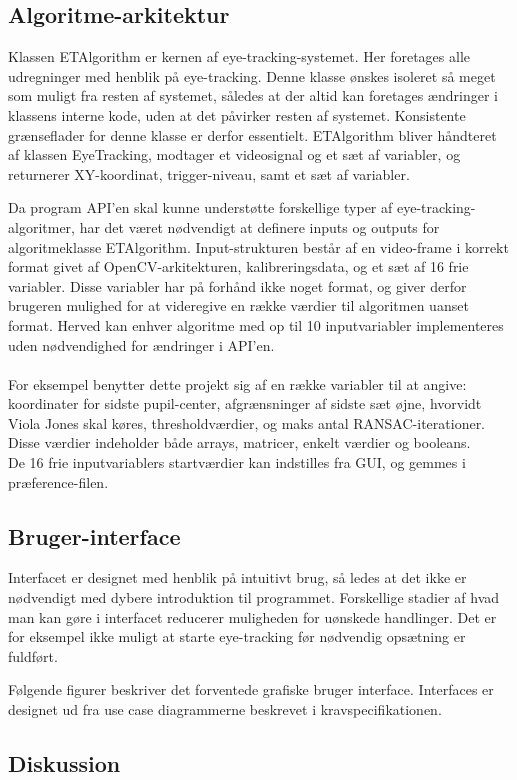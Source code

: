 \documentclass[rapport.tex]{subfiles}
\begin{document}
	\subsection{Algoritme-arkitektur}
	Klassen ETAlgorithm er kernen af eye-tracking-systemet. Her foretages alle udregninger med henblik på eye-tracking. Denne klasse ønskes isoleret så meget som muligt fra resten af systemet, således at der altid kan foretages ændringer i klassens interne kode, uden at det påvirker resten af systemet. Konsistente grænseflader for denne klasse er derfor essentielt. 
	ETAlgorithm bliver håndteret af klassen EyeTracking, modtager et videosignal og et sæt af variabler, og returnerer XY-koordinat, trigger-niveau, samt et sæt af variabler. 
	
	Da program API'en skal kunne understøtte forskellige typer af eye-tracking-algoritmer, har det været nødvendigt at definere inputs og outputs for algoritmeklasse ETAlgorithm. Input-strukturen består af en video-frame i korrekt format givet af OpenCV-arkitekturen, kalibreringsdata, og et sæt af 16 frie variabler. Disse variabler har på forhånd ikke noget format, og giver derfor brugeren mulighed for at videregive en række værdier til algoritmen uanset format. Herved kan enhver algoritme med op til 10 inputvariabler implementeres uden nødvendighed for ændringer i API'en.\\
	\\
	 For eksempel benytter dette projekt sig af en række variabler til at angive: koordinater for sidste pupil-center, afgrænsninger af sidste sæt øjne, hvorvidt Viola Jones skal køres, thresholdværdier, og maks antal RANSAC-iterationer.  Disse værdier indeholder både arrays, matricer, enkelt værdier og  booleans.
	\\
	De 16 frie inputvariablers startværdier kan indstilles fra GUI, og gemmes i præference-filen. 
	\subsection{Bruger-interface}
	Interfacet er designet med henblik på intuitivt brug, så ledes at det ikke er nødvendigt med dybere introduktion til programmet. Forskellige stadier af hvad man kan gøre i interfacet reducerer muligheden for uønskede handlinger. Det er for eksempel ikke muligt at starte eye-tracking før nødvendig opsætning er fuldført. 
	
	Følgende figurer beskriver det forventede grafiske bruger interface. Interfaces er designet ud fra use case diagrammerne beskrevet i kravspecifikationen.
	\subsection{Diskussion}
\end{document}
